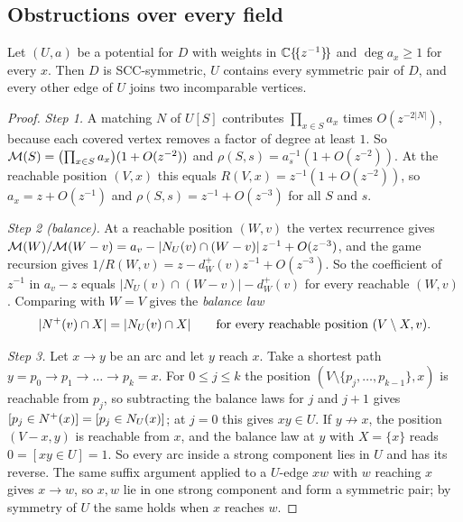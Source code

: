 \subsection{Obstructions over every field}

\begin{theorem}\label{thm:normal}
Let $(U,a)$ be a potential for $D$ with weights in $\CC\{\!\{z^{-1}\}\!\}$ and $\deg a_x\ge1$ for every $x$. Then $D$ is SCC-symmetric, $U$ contains every symmetric pair of $D$, and every other edge of $U$ joins two incomparable vertices.
\end{theorem}
\begin{proof}
\emph{Step 1.} A matching $N$ of $U[S]$ contributes $\prod_{x\in S}a_x$ times $O(z^{-2|N|})$, because each covered vertex removes a factor of degree at least $1$. So $\Mpot(S)=\bigl(\prod_{x\in S}a_x\bigr)(1+O(z^{-2}))$ and $\rho(S,s)=a_s^{-1}(1+O(z^{-2}))$. At the reachable position $(V,x)$ this equals $R(V,x)=z^{-1}(1+O(z^{-2}))$, so $a_x=z+O(z^{-1})$ and $\rho(S,s)=z^{-1}+O(z^{-3})$ for all $S$ and $s$.

\emph{Step 2 (balance).} At a reachable position $(W,v)$ the vertex recurrence gives $\Mpot(W)/\Mpot(W-v)=a_v-|N_U(v)\cap(W-v)|\,z^{-1}+O(z^{-3})$, and the game recursion gives $1/R(W,v)=z-d^{+}_W(v)z^{-1}+O(z^{-3})$. So the coefficient of $z^{-1}$ in $a_v-z$ equals $|N_U(v)\cap(W-v)|-d^{+}_W(v)$ for every reachable $(W,v)$. Comparing with $W=V$ gives the \emph{balance law}
\[
|\nplus(v)\cap X|=|N_U(v)\cap X|\qquad\text{for every reachable position }(V\setminus X,v).
\]

\emph{Step 3.} Let $x\to y$ be an arc and let $y$ reach $x$. Take a shortest path $y=p_0\to p_1\to\dots\to p_k=x$. For $0\le j\le k$ the position $(V\setminus\{p_j,\dots,p_{k-1}\},x)$ is reachable from $p_j$, so subtracting the balance laws for $j$ and $j+1$ gives $[p_j\in\nplus(x)]=[p_j\in N_U(x)]$; at $j=0$ this gives $xy\in U$. If $y\not\to x$, the position $(V-x,y)$ is reachable from $x$, and the balance law at $y$ with $X=\{x\}$ reads $0=[xy\in U]=1$. So every arc inside a strong component lies in $U$ and has its reverse. The same suffix argument applied to a $U$-edge $xw$ with $w$ reaching $x$ gives $x\to w$, so $x,w$ lie in one strong component and form a symmetric pair; by symmetry of $U$ the same holds when $x$ reaches $w$.
\end{proof}

